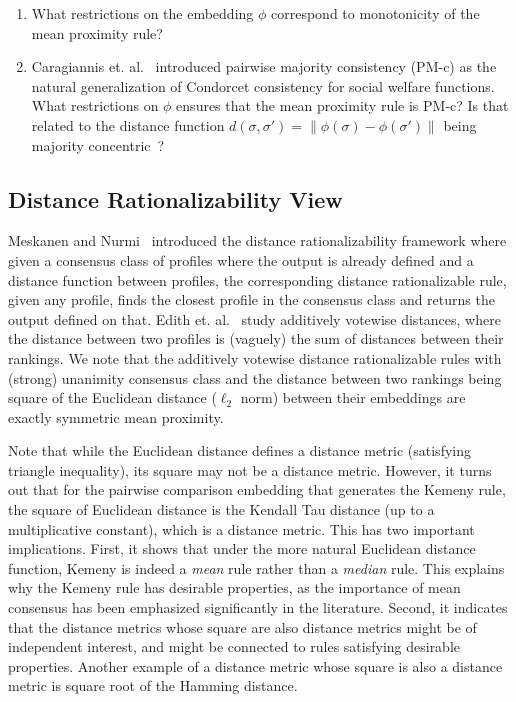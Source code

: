 \documentclass[10pt,letterpaper]{article}
\begin{document}
\begin{enumerate}
\item What restrictions on the embedding $\phi$ correspond to monotonicity of the mean proximity rule?
\item Caragiannis et. al.~\cite{CPS13} introduced pairwise majority consistency (PM-c) as the natural generalization of Condorcet consistency for social welfare functions. What restrictions on $\phi$ ensures that the mean proximity rule is PM-c? Is that related to the distance function $d(\sigma,\sigma') = \|\phi(\sigma)-\phi(\sigma')\|$ being majority concentric~\cite{CPS13}?
\end{enumerate}


\subsection{Distance Rationalizability View}
Meskanen and Nurmi~\cite{MN08} introduced the distance rationalizability framework where given a consensus class of profiles where the output is already defined and a distance function between profiles, the corresponding distance rationalizable rule, given any profile, finds the closest profile in the consensus class and returns the output defined on that. Edith et. al.~\cite{EFS10} study additively votewise distances, where the distance between two profiles is (vaguely) the sum of distances between their rankings. We note that the additively votewise distance rationalizable rules with (strong) unanimity consensus class and the distance between two rankings being square of the Euclidean distance ($\ell_2$ norm) between their embeddings are exactly symmetric mean proximity. 

Note that while the Euclidean distance defines a distance metric (satisfying triangle inequality), its square may not be a distance metric. However, it turns out that for the pairwise comparison embedding that generates the Kemeny rule, the square of Euclidean distance is the Kendall Tau distance (up to a multiplicative constant), which is a distance metric. This has two important implications. First, it shows that under the more natural Euclidean distance function, Kemeny is indeed a \emph{mean} rule rather than a \emph{median} rule. This explains why the Kemeny rule has desirable properties, as the importance of mean consensus has been emphasized significantly in the literature. Second, it indicates that the distance metrics whose square are also distance metrics might be of independent interest, and might be connected to rules satisfying desirable properties. Another example of a distance metric whose square is also a distance metric is square root of the Hamming distance.
\end{document}
